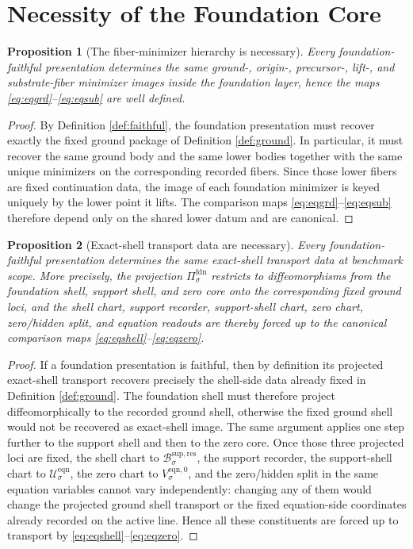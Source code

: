 \documentclass[11pt]{article}
\newcommand{\FoundProj}[1]{\Pi_{#1}^{\mathrm{fdn}}}
\newcommand{\ResBody}[1]{\mathcal B_{#1}^{\mathrm{sup,res}}}
\newcommand{\EqnSpace}[1]{\mathcal U_{#1}^{\mathrm{eqn}}}
\newcommand{\EqnZero}[1]{V_{#1}^{\mathrm{eqn},0}}
\newtheorem{proposition}{Proposition}
\begin{document}
\section{Necessity of the Foundation Core}

\begin{proposition}[The fiber-minimizer hierarchy is necessary]
\label{prop:minimizers}
Every foundation-faithful presentation determines the same ground-, origin-, precursor-, lift-, and substrate-fiber minimizer images inside the foundation layer, hence the maps \eqref{eq:eqgrd}--\eqref{eq:eqsub} are well defined.
\end{proposition}

\begin{proof}
By Definition \ref{def:faithful}, the foundation presentation must recover exactly the fixed ground package of Definition \ref{def:ground}. In particular, it must recover the same ground body and the same lower bodies together with the same unique minimizers on the corresponding recorded fibers. Since those lower fibers are fixed continuation data, the image of each foundation minimizer is keyed uniquely by the lower point it lifts. The comparison maps \eqref{eq:eqgrd}--\eqref{eq:eqsub} therefore depend only on the shared lower datum and are canonical.
\end{proof}

\begin{proposition}[Exact-shell transport data are necessary]
\label{prop:shell}
Every foundation-faithful presentation determines the same exact-shell transport data at benchmark scope. More precisely, the projection \(\FoundProj{\sigma}\) restricts to diffeomorphisms from the foundation shell, support shell, and zero core onto the corresponding fixed ground loci, and the shell chart, support recorder, support-shell chart, zero chart, zero/hidden split, and equation readouts are thereby forced up to the canonical comparison maps \eqref{eq:eqshell}--\eqref{eq:eqzero}.
\end{proposition}

\begin{proof}
If a foundation presentation is faithful, then by definition its projected exact-shell transport recovers precisely the shell-side data already fixed in Definition \ref{def:ground}. The foundation shell must therefore project diffeomorphically to the recorded ground shell, otherwise the fixed ground shell would not be recovered as exact-shell image. The same argument applies one step further to the support shell and then to the zero core. Once those three projected loci are fixed, the shell chart to \(\ResBody{\sigma}\), the support recorder, the support-shell chart to \(\EqnSpace{\sigma}\), the zero chart to \(\EqnZero{\sigma}\), and the zero/hidden split in the same equation variables cannot vary independently: changing any of them would change the projected ground shell transport or the fixed equation-side coordinates already recorded on the active line. Hence all these constituents are forced up to transport by \eqref{eq:eqshell}--\eqref{eq:eqzero}.
\end{proof}
\end{document}
